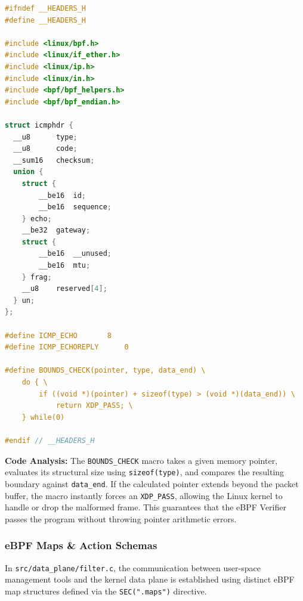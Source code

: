 \documentclass[11pt,a4paper]{article}
\begin{document}
\begin{lstlisting}[language=C, title={src/data\_plane/headers.h - Core Macros \& Structures}]
#ifndef __HEADERS_H
#define __HEADERS_H

#include <linux/bpf.h>
#include <linux/if_ether.h>
#include <linux/ip.h>
#include <linux/in.h>
#include <bpf/bpf_helpers.h>
#include <bpf/bpf_endian.h>

struct icmphdr {
  __u8		type;
  __u8		code;
  __sum16	checksum;
  union {
	struct {
		__be16	id;
		__be16	sequence;
	} echo;
	__be32	gateway;
	struct {
		__be16	__unused;
		__be16	mtu;
	} frag;
	__u8	reserved[4];
  } un;
};

#define ICMP_ECHO		8
#define ICMP_ECHOREPLY		0

#define BOUNDS_CHECK(pointer, type, data_end) \
    do { \
        if ((void *)(pointer) + sizeof(type) > (void *)(data_end)) \
            return XDP_PASS; \
    } while(0)

#endif // __HEADERS_H
\end{lstlisting}

\noindent \textbf{Code Analysis:} The \texttt{BOUNDS\_CHECK} macro takes a given memory pointer, evaluates its structural size using \texttt{sizeof(type)}, and compares the resulting boundary against \texttt{data\_end}.
If the calculated pointer extends beyond the packet buffer, the macro instantly forces an \texttt{XDP\_PASS}, allowing the Linux kernel to handle or drop the malformed frame.
This guarantees that the eBPF Verifier passes the program without throwing pointer arithmetic errors.

\subsubsection{eBPF Maps \& Action Schemas}

In \texttt{src/data\_plane/filter.c}, the communication between user-space management tools and the kernel data plane is established using distinct eBPF map structures defined via the \texttt{SEC(".maps")} directive.
\end{document}
